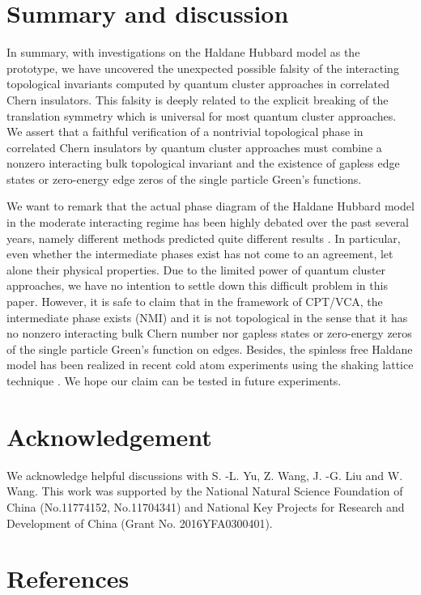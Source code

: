 \documentclass[12pt]{iopart}
\begin{document}
\section{Summary and discussion}\label{SD}

\par In summary, with investigations on the Haldane Hubbard model as the prototype, we have uncovered the unexpected possible falsity of the interacting topological invariants computed by quantum cluster approaches in correlated Chern insulators. This falsity is deeply related to the explicit breaking of the translation symmetry which is universal for most quantum cluster approaches. We assert that a faithful verification of a nontrivial topological phase in correlated Chern insulators by quantum cluster approaches must combine a nonzero interacting bulk topological invariant and the existence of gapless edge states or zero-energy edge zeros of the single particle Green's functions.

\par We want to remark that the actual phase diagram of the Haldane Hubbard model in the moderate interacting regime has been highly debated over the past several years, namely different methods predicted quite different results \cite{HZKL_PRB2011-1,HZKL_PRB2011-2,MR_PRB2013,HRP_PRB2015,ZSWZ_PRB2015,HCPP_PRL2016,VSLTHT_PRL2016,IWT_PRB2016,ASHP_PRB2016,GJMP_PRB2016,GR_NJP2018,LTTNNH_PBCM2018}. In particular, even whether the intermediate phases exist has not come to an agreement, let alone their physical properties. Due to the limited power of quantum cluster approaches, we have no intention to settle down this difficult problem in this paper. However, it is safe to claim that in the framework of CPT/VCA, the intermediate phase exists (NMI) and it is not topological in the sense that it has no nonzero interacting bulk Chern number nor gapless states or zero-energy zeros of the single particle Green's function on edges. Besides, the spinless free Haldane model has been realized in recent cold atom experiments using the shaking lattice technique \cite{JMDRLUGE_N2014}. We hope our claim can be tested in future experiments.


\section*{Acknowledgement}
\par We acknowledge helpful discussions with S. -L. Yu, Z. Wang, J. -G. Liu and W. Wang. This work was supported by the National Natural Science Foundation of China (No.11774152, No.11704341) and National Key Projects for Research and Development of China (Grant No. 2016YFA0300401).

\section*{References}

\end{document}
